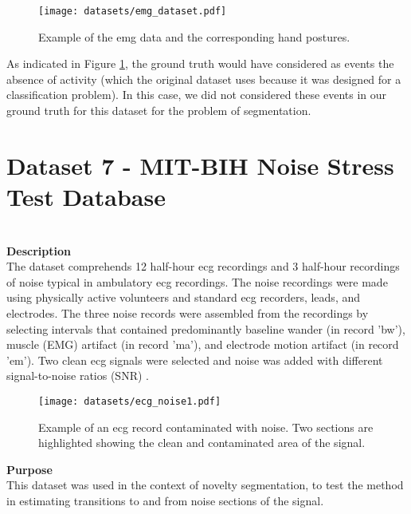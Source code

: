\begin{figure}
\centering
\texttt{[image: datasets/emg\_dataset.pdf]}
\caption{Example of the \gls{emg} data and the corresponding hand postures.}
\label{fig:emg_dataset}
\end{figure}

As indicated in Figure \ref{fig:emg_dataset}, the ground truth would have considered as events the absence of activity (which the original dataset uses because it was designed for a classification problem). In this case, we did not considered these events in our ground truth for this dataset for the problem of segmentation.    

%

\section{Dataset 7 - MIT-BIH Noise Stress Test Database}\\
\textbf{Description}\\
The dataset comprehends 12 half-hour \gls{ecg} recordings and 3 half-hour recordings of noise typical in ambulatory \gls{ecg} recordings. The noise recordings were made using physically active volunteers and standard \gls{ecg} recorders, leads, and electrodes. The three noise records were assembled from the recordings by selecting intervals that contained predominantly baseline wander (in record 'bw'), muscle (EMG) artifact (in record 'ma'), and electrode motion artifact (in record 'em'). Two clean \gls{ecg} signals were selected and noise was added with different signal-to-noise ratios (SNR) \cite{dataset6, PhysioNet}.\\

\begin{figure}
\centering
\texttt{[image: datasets/ecg\_noise1.pdf]}
\caption{Example of an \gls{ecg} record contaminated with noise. Two sections are highlighted showing the clean and contaminated area of the signal. \cite{dataset7}}
\label{fig:ecg1_dataset}
\end{figure}

\textbf{Purpose}\\
This dataset was used in the context of novelty segmentation, to test the method in estimating transitions to and from noise sections of the signal.
    
